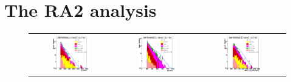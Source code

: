 
\section{The RA2 analysis} \label{sec:RA2:RA2analysis}

\begin{figure}
  \begin{center}
    \begin{tabular}{ccc}
      \includegraphics[width=0.5\textwidth]{figures/RA2/c_RA2_HTMHT_3J_dPhi_lepVeto_h_HT.pdf} &
      \includegraphics[width=0.5\textwidth]{figures/RA2/c_RA2_HTMHT_3J_dPhi_lepVeto_h_MHT.pdf} &
      \includegraphics[width=0.5\textwidth]{figures/RA2/c_RA2_HTMHT_3J_dPhi_lepVeto_h_MEff.pdf} \\ 
    \end{tabular}
  \end{center}
  \caption{}
  \label{fig:RA2:Results:Prediction}
\end{figure}




